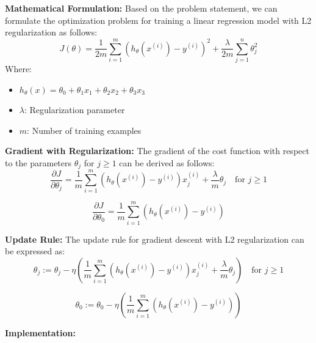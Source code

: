 \documentclass[
  letterpaper,
  DIV=11,
  numbers=noendperiod]{scrreprt}
\providecommand{\tightlist}{%
  \setlength{\itemsep}{0pt}\setlength{\parskip}{0pt}}
\begin{document}
\textbf{Mathematical Formulation:} Based on the problem statement, we
can formulate the optimization problem for training a linear regression
model with L2 regularization as follows: \[
J(\theta) = \frac{1}{2m} \sum_{i=1}^m (h_\theta(x^{(i)}) - y^{(i)})^2 + \frac{\lambda}{2m} \sum_{j=1}^n \theta_j^2
\] Where:

\begin{itemize}
\tightlist
\item
  \(h_\theta(x) = \theta_0 + \theta_1 x_1 + \theta_2 x_2 + \theta_3 x_3\)
\item
  \(\lambda\): Regularization parameter
\item
  \(m\): Number of training examples
\end{itemize}

\textbf{Gradient with Regularization:} The gradient of the cost function
with respect to the parameters \(\theta_j\) for \(j \geq 1\) can be
derived as follows:\\
\[
\frac{\partial J}{\partial \theta_j} = \frac{1}{m} \sum_{i=1}^m (h_\theta(x^{(i)}) - y^{(i)}) x_j^{(i)} + \frac{\lambda}{m} \theta_j \quad \text{for } j \geq 1
\]

\[
\frac{\partial J}{\partial \theta_0} = \frac{1}{   m} \sum_{i=1}^m (h_\theta(x^{(i)}) - y^{(i)})
\]

\textbf{Update Rule:} The update rule for gradient descent with L2
regularization can be expressed as: \[
\theta_j := \theta_j - \eta \left( \frac{1}{m} \sum_{i=1}^m (h_\theta(x^{(i)}) - y^{(i)}) x_j^{(i)} + \frac{\lambda}{m} \theta_j \right) \quad \text{for } j \geq 1
\]

\[
\theta_0 := \theta_0 - \eta \left( \frac{1}{m} \sum_{i=1}^m (h_\theta(x^{(i)}) - y^{(i)}) \right)
\]

\textbf{Implementation:}
\end{document}
